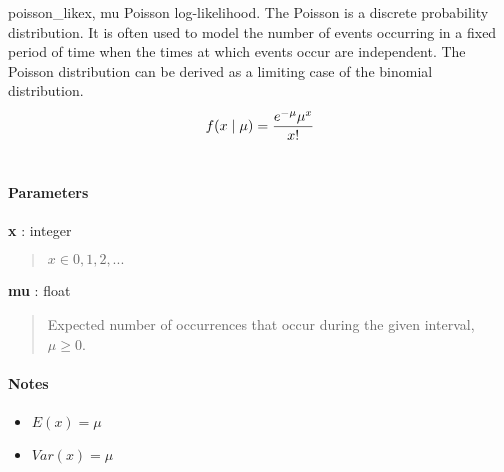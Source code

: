 \hypertarget{pymc.distributions.poisson_like}{}
\begin{funcdesc}{poisson\_like}{x, mu}
Poisson log-likelihood. The Poisson is a discrete probability distribution.
It is often used to model the number of events occurring in a fixed period of
time when the times at which events occur are independent. The Poisson
distribution can be derived as a limiting case of the binomial distribution.
\begin{gather}
\begin{split}f(x \mid \mu) = \frac{e^{-\mu}\mu^x}{x!}\end{split}\notag\\\begin{split}\end{split}\notag
\end{gather}
\paragraph{Parameters}
\begin{paramlist}
\item[]\textbf{x} : integer
\begin{quote}

$x \in {0,1,2,...}$
\end{quote}

\item[]\textbf{mu} : float
\begin{quote}

Expected number of occurrences that occur during the given interval,
$\mu \geq 0$.
\end{quote}
\end{paramlist}
\paragraph{Notes}
\begin{itemize}
\item {}
$E(x)=\mu$

\item {}
$Var(x)=\mu$

\end{itemize}
\end{funcdesc}

